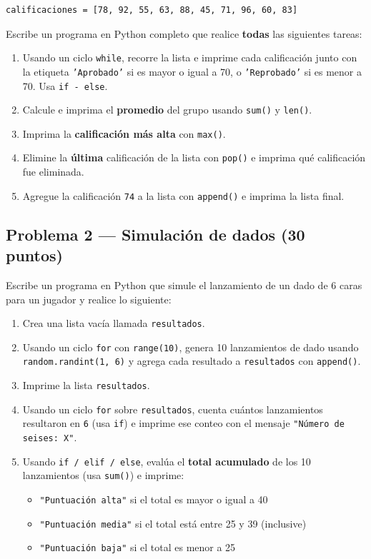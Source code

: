 \documentclass[12pt,a4paper]{article}
\begin{document}
\begin{lstlisting}[style=PythonStyle]
calificaciones = [78, 92, 55, 63, 88, 45, 71, 96, 60, 83]
\end{lstlisting}

\noindent Escribe un programa en Python completo que realice \textbf{todas} las siguientes tareas:

\begin{enumerate}[leftmargin=2em, itemsep=5pt]
  \item Usando un ciclo \texttt{while}, recorre la lista e imprime cada calificación junto con la etiqueta \texttt{'Aprobado'} si es mayor o igual a 70, o \texttt{'Reprobado'} si es menor a 70. Usa \texttt{if - else}.
  \item Calcule e imprima el \textbf{promedio} del grupo usando \lstinline|sum()| y \lstinline|len()|.
  \item Imprima la \textbf{calificación más alta} con \lstinline|max()|.
  \item Elimine la \textbf{última} calificación de la lista con \lstinline|pop()| e imprima qué calificación fue eliminada.
  \item Agregue la calificación \texttt{74} a la lista con \lstinline|append()| e imprima la lista final.
\end{enumerate}


\subsection*{Problema 2 — Simulación de dados (30 puntos)}

\noindent Escribe un programa en Python que simule el lanzamiento de un dado de 6 caras para un jugador y realice lo siguiente:

\begin{enumerate}[leftmargin=2em, itemsep=5pt]
  \item Crea una lista vacía llamada \lstinline|resultados|.
  \item Usando un ciclo \texttt{for} con \lstinline|range(10)|, genera 10 lanzamientos de dado usando \lstinline|random.randint(1, 6)| y agrega cada resultado a \lstinline|resultados| con \lstinline|append()|.
  \item Imprime la lista \lstinline|resultados|.
  \item Usando un ciclo \texttt{for} sobre \lstinline|resultados|, cuenta cuántos lanzamientos resultaron en \texttt{6} (usa \texttt{if}) e imprime ese conteo con el mensaje \texttt{"Número de seises: X"}.
  \item Usando \texttt{if / elif / else}, evalúa el \textbf{total acumulado} de los 10 lanzamientos (usa \lstinline|sum()|) e imprime:
    \begin{itemize}
      \item \texttt{"Puntuación alta"} si el total es mayor o igual a 40
      \item \texttt{"Puntuación media"} si el total está entre 25 y 39 (inclusive)
      \item \texttt{"Puntuación baja"} si el total es menor a 25
    \end{itemize}
\end{enumerate}
\end{document}
